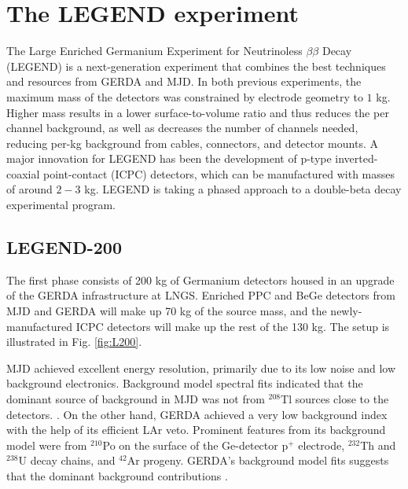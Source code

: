 \section{The LEGEND experiment}
The Large Enriched Germanium Experiment for Neutrinoless $\beta\beta$ Decay (LEGEND) is a next-generation experiment that combines the best techniques and resources from GERDA and MJD. In both previous experiments, the maximum mass of the detectors was constrained by electrode geometry to $1$ kg. Higher mass results in a lower surface-to-volume ratio and thus reduces the per channel background, as well as decreases the number of channels needed, reducing per-kg background from cables, connectors, and detector mounts. A major innovation for LEGEND has been the development of p-type inverted-coaxial point-contact (ICPC) detectors, which can be manufactured with masses of around $2-3$ kg. LEGEND is taking a phased approach to a double-beta decay experimental program.

\subsection{LEGEND-200}

The first phase consists of 200 kg of Germanium detectors housed in an upgrade of the GERDA infrastructure at LNGS. Enriched PPC and BeGe detectors from MJD and GERDA will make up 70 kg of the source mass, and the newly-manufactured ICPC detectors will make up the rest of the 130 kg. The setup is illustrated in Fig. \ref{fig:L200}.

MJD achieved excellent energy resolution, primarily due to its low noise and low background electronics. Background model spectral fits indicated that the dominant source of background in MJD was not from $^{208}$Tl sources close to the detectors. \cite{Buuck_thesis}. On the other hand, GERDA achieved a very low background index with the help of its efficient LAr veto. Prominent features from its background model were from $^{210}$Po on the surface of the Ge-detector p$^+$ electrode, $^{232}$Th and $^{238}$U decay chains, and $^{42}$Ar progeny. GERDA's background model fits suggests that the dominant background contributions \cite{GERDA_final}.

